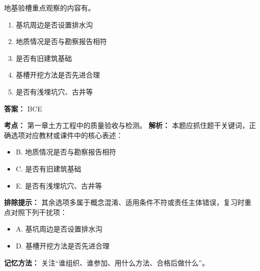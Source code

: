 \documentclass[UTF8,fontset=fandol,11pt]{ctexart}
\begin{document}
\vspace{0.2em}

\begin{quizbox}[title={第 27 题}]
地基验槽重点观察的内容有。\\
\begin{enumerate}[label=\Alph*.]
\item 基坑周边是否设置排水沟
\item 地质情况是否与勘察报告相符
\item 是否有旧建筑基础
\item 基槽开挖方法是否先进合理
\item 是否有浅埋坑穴、古井等
\end{enumerate}
\textbf{答案：} BCE
\vspace{0.25em}
\begin{answerbox}[title={考点解析}]
\textbf{考点：} 第一章土方工程中的质量验收与检测。
\textbf{解析：} 本题应抓住题干关键词，正确选项对应教材或课件中的核心表述：
\begin{itemize}
\item B. 地质情况是否与勘察报告相符
\item C. 是否有旧建筑基础
\item E. 是否有浅埋坑穴、古井等
\end{itemize}
\textbf{排除提示：} 其余选项多属于概念混淆、适用条件不符或责任主体错误，复习时重点对照下列干扰项：
\begin{itemize}
\item A. 基坑周边是否设置排水沟
\item D. 基槽开挖方法是否先进合理
\end{itemize}
\textbf{记忆方法：} 关注“谁组织、谁参加、用什么方法、合格后做什么”。
\end{answerbox}
\end{quizbox}

\vspace{0.2em}
\end{document}
